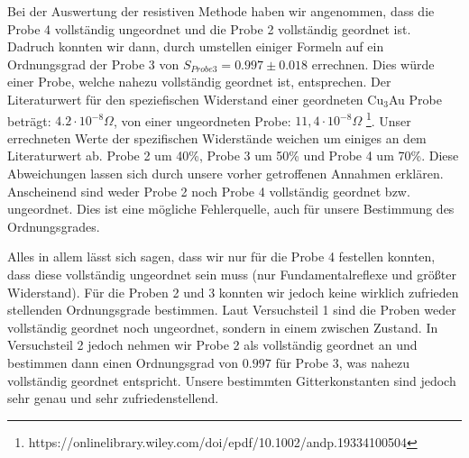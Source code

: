     Bei der Auswertung der resistiven Methode haben wir angenommen, dass die Probe 4 vollständig
    ungeordnet und die Probe 2 vollständig geordnet ist. Dadruch konnten wir dann, durch umstellen einiger Formeln
    auf ein Ordnungsgrad der Probe 3 von $S_{Probe 3} = 0.997 \pm 0.018$ errechnen. 
    Dies würde einer Probe, welche nahezu vollständig geordnet ist, entsprechen. 
    Der Literaturwert für den speziefischen Widerstand einer geordneten Cu$_3$Au Probe beträgt: $4.2 \cdot 10^{-8}\Omega$, von einer ungeordneten
    Probe: $11,4\cdot 10^{-8}\Omega$ \footnote{https://onlinelibrary.wiley.com/doi/epdf/10.1002/andp.19334100504}.
    Unser errechneten Werte der spezifischen Widerstände weichen um einiges an dem Literaturwert ab.
    Probe 2 um 40\%, Probe 3 um 50\% und Probe 4 um 70\%. Diese Abweichungen lassen sich durch 
    unsere vorher getroffenen Annahmen erklären. Anscheinend sind weder Probe 2 noch Probe 4 vollständig geordnet bzw. ungeordnet.
    Dies ist eine mögliche Fehlerquelle, auch für unsere Bestimmung des Ordnungsgrades.
    
    Alles in allem lässt sich sagen, dass wir nur für die Probe 4 festellen konnten, dass diese vollständig ungeordnet sein muss
    (nur Fundamentalreflexe und größter Widerstand). Für die Proben 2 und 3 konnten wir jedoch keine wirklich zufrieden stellenden
    Ordnungsgrade bestimmen. Laut Versuchsteil 1 sind die Proben weder vollständig geordnet noch ungeordnet, sondern in einem
    zwischen Zustand. In Versuchsteil 2 jedoch nehmen wir Probe 2 als vollständig geordnet an und bestimmen
    dann einen Ordnungsgrad von $0.997$ für Probe 3, was nahezu vollständig geordnet entspricht. 
    Unsere bestimmten Gitterkonstanten sind jedoch sehr genau und sehr zufriedenstellend.